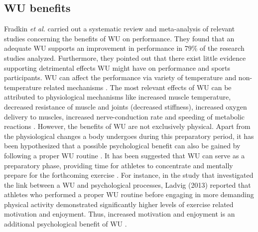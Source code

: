 \subsection{WU benefits}
Fradkin \textit{et al.} carried out a systematic review and meta-analysis of relevant studies concerning the benefits of WU on performance. They found that an adequate WU supports an improvement in performance in 79\% of the research studies analyzed. Furthermore, they pointed out that there exist little evidence supporting detrimental effects WU might have on performance and sports participants.
WU can affect the performance via variety of temperature and non-temperature related mechanisms \cite{bishop2003warm1}. 
The most relevant effects of WU can be attributed to physiological mechanisms like increased muscle temperature, decreased resistance of muscle and joints (decreased stiffness), increased oxygen delivery to muscles, increased nerve-conduction rate and speeding of metabolic reactions \cite{bishop2003warm1}. 
However, the benefits of WU are not exclusively physical. Apart from the physiological changes a body undergoes during this preparatory period, it has been hypothesized that a possible psychological benefit can also be gained by following a proper WU routine \cite{bishop2003warm1,shellock1985warming}.
It has been suggested that WU can serve as a preparatory phase, providing time for athletes to concentrate and mentally prepare for the forthcoming exercise \cite{shellock1985warming}. 
For instance, in the study that investigated the link between a WU and psychological processes, Ladvig (2013) reported that athletes who performed a proper WU routine before engaging in more demanding physical activity demonstrated significantly higher levels of exercise related motivation and enjoyment. Thus, increased motivation and enjoyment is an additional psychological benefit of WU \cite{ladwig2013psychological}.
